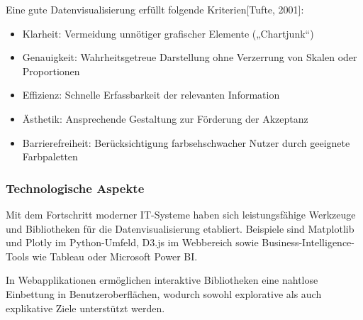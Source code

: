 Eine gute Datenvisualisierung erfüllt folgende Kriterien[Tufte, 2001]:


\begin{itemize}

\item
Klarheit: Vermeidung unnötiger grafischer Elemente („Chartjunk“)
\item
Genauigkeit: Wahrheitsgetreue Darstellung ohne Verzerrung von Skalen oder Proportionen
\item
Effizienz: Schnelle Erfassbarkeit der relevanten Information
\item
Ästhetik: Ansprechende Gestaltung zur Förderung der Akzeptanz
\item
Barrierefreiheit: Berücksichtigung farbsehschwacher Nutzer durch geeignete Farbpaletten

\end{itemize}

\subsubsection{Technologische Aspekte}

Mit dem Fortschritt moderner IT-Systeme haben sich leistungsfähige Werkzeuge und Bibliotheken für die Datenvisualisierung etabliert. Beispiele sind Matplotlib und Plotly im Python-Umfeld, D3.js im Webbereich sowie Business-Intelligence-Tools wie Tableau oder Microsoft Power BI.

In Webapplikationen ermöglichen interaktive Bibliotheken eine nahtlose Einbettung in Benutzeroberflächen, wodurch sowohl explorative als auch explikative Ziele unterstützt werden.

